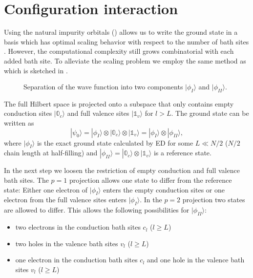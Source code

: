 \section{Configuration interaction}
\label{sec:configuration-interaction}


Using the natural impurity orbitals () allows us to
write the ground state in a basis which has optimal scaling behavior with respect to
the number of bath sites \cite{Lu2019}.
However, the computational complexity still grows combinatorial with each added bath site.
To alleviate the scaling problem we employ the same method as \citeauthor{Lu2019} \cite{Lu2019}
which is sketched in .

\begin{figure}[ht]
    \centering
    
    \caption{
        Separation of the wave function into two components
        $|\phi_I\rangle$ and $|\phi_{II}\rangle$.
    }
    \label{fig:aim-separation}
\end{figure}

The full Hilbert space is projected onto a subspace that only contains
empty conduction sites $|\mathbb{0}_c\rangle$
and full valence sites $|\mathbb{1}_v\rangle$ for $l>L$.
The ground state can be written as
\begin{equation}
    |\psi_0\rangle
    =
    |\phi_I\rangle \otimes |\mathbb{0}_c\rangle \otimes |\mathbb{1}_v\rangle
    =
    |\phi_I\rangle \otimes |\phi_{II}\rangle,
\end{equation}
where $|\phi_I\rangle$ is the exact ground state calculated by ED for some $L\ll N/2$
($N/2$ chain length at half-filling)
and $|\phi_{II}\rangle = |\mathbb{0}_c\rangle \otimes |\mathbb{1}_v\rangle$ is a reference state.

In the next step we loosen the restriction of empty conduction and full valence bath sites.
The $p=1$ projection allows one state to differ from the reference state:
Either one electron of $|\phi_I\rangle$ enters the empty conduction sites
or one electron from the full valence sites enters $|\phi_I\rangle$.
In the $p=2$ projection two states are allowed to differ.
This allows the following possibilities for $|\phi_{II}\rangle$:
\begin{itemize}
    \item two electrons in the conduction bath sites $c_l$ ($l\ge L$)
    \item two holes in the valence bath sites $v_l$ ($l\ge L$)
    \item one electron in the conduction bath sites $c_l$
          and one hole in the valence bath sites $v_l$ ($l\ge L$)
\end{itemize}

